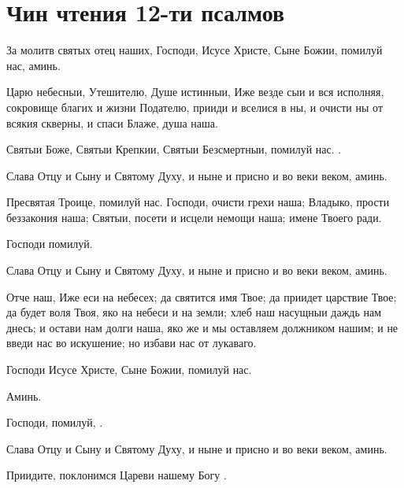 \section{Чин чтения 12-ти псалмов}\begin{mymulticols}









За молитв святых отец наших, Господи, Исусе Христе, Сыне Божии, помилуй нас, аминь. 




Царю небесныи, Утешителю, Душе истинныи, Иже везде сыи и вся исполняя, сокровище благих и жизни Подателю, прииди и вселися в ны, и очисти ны от всякия скверны, и спаси Блаже, душа наша.

Святыи Боже, Святыи Крепкии, Святыи Безсмертныи, помилуй нас. .

Слава Отцу и Сыну и Святому Духу, и ныне и присно и во веки веком, аминь.

Пресвятая Троице, помилуй нас. Господи, очисти грехи наша; Владыко, прости беззакония наша; Святыи, посети и исцели немощи наша; имене Твоего ради.

Господи помилуй. 

Слава Отцу и Сыну и Святому Духу, и ныне и присно и во веки веком, аминь.

Отче наш, Иже еси на небесех; да святится имя Твое; да приидет царствие Твое; да будет воля Твоя, яко на небеси и на земли; хлеб наш насущныи даждь нам днесь; и остави нам долги наша, яко же и мы оставляем должником нашим; и не введи нас во искушение; но избави нас от лукаваго.

Господи Исусе Христе, Сыне Божии, помилуй нас.

Аминь.

Господи, помилуй, .

Слава Отцу и Сыну и Святому Духу, и ныне и присно и во веки веком, аминь.

Приидите, поклонимся Цареви нашему Богу .


\end{mymulticols}
